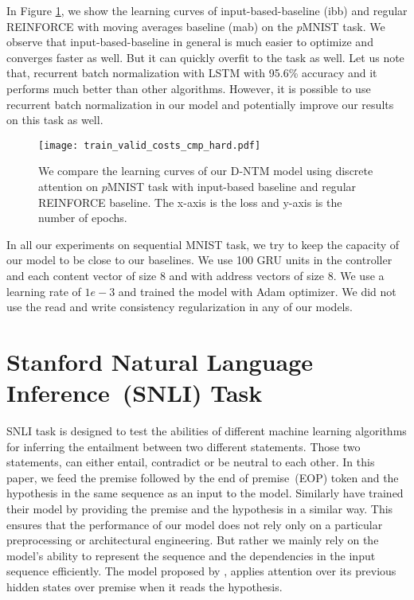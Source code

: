 \documentclass[12pt]{article}
\begin{document}
In Figure \ref{fig:dntm_reinforce_baselines_cmp}, we show the learning curves of input-based-baseline (ibb) and regular REINFORCE with moving averages baseline (mab) on the $p$MNIST task. We observe that input-based-baseline in general is much easier to optimize and converges faster as well. But it can quickly overfit to the task as well. Let us note that, recurrent batch normalization with LSTM \citep{cooijmans2016recurrent} with 95.6\% accuracy and it performs much better than other algorithms. However, it is possible to use recurrent batch normalization in our model and potentially improve our results on this task as well.

\begin{figure}[htbp]
\centering
\texttt{[image: train\_valid\_costs\_cmp\_hard.pdf]}
\caption{We compare the learning curves of our D-NTM model using discrete attention on $p$MNIST task with input-based baseline and regular REINFORCE baseline. The x-axis is the loss and y-axis is the number of epochs.}
\label{fig:dntm_reinforce_baselines_cmp}
\end{figure}

In all our experiments on sequential MNIST task, we try to keep the capacity of our model to be close to our baselines. We use  100 GRU units in the controller and each content vector of size 8 and with address vectors of size 8. We use a learning rate of $1e-3$ and trained the model with Adam optimizer. We did not use the read and write consistency regularization in any of our models.

\section{Stanford Natural Language Inference~(SNLI) Task}

SNLI task \citep{bowman2015large} is designed to test the abilities of different machine learning algorithms for inferring the entailment between two different statements. Those two statements, can either entail, contradict or be neutral to each other. In this paper, we feed the premise followed by the end of premise~(EOP) token and the hypothesis in the same sequence as an input to the model. Similarly \cite{rocktaschel2015reasoning} have trained their model by providing the premise and the hypothesis in a similar way. This ensures that the performance of our model does not rely only on a particular preprocessing or architectural engineering. But rather we mainly rely on the model's ability to represent the sequence and the dependencies in the input sequence efficiently. The model proposed by \cite{rocktaschel2015reasoning}, applies attention over its previous hidden states over premise when it reads the hypothesis.
\end{document}

